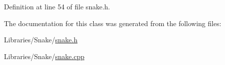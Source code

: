 Definition at line 54 of file snake.\+h.



The documentation for this class was generated from the following files\+:\begin{DoxyCompactItemize}
\item 
Libraries/\+Snake/\mbox{\hyperlink{snake_8h}{snake.\+h}}\item 
Libraries/\+Snake/\mbox{\hyperlink{snake_8cpp}{snake.\+cpp}}\end{DoxyCompactItemize}
